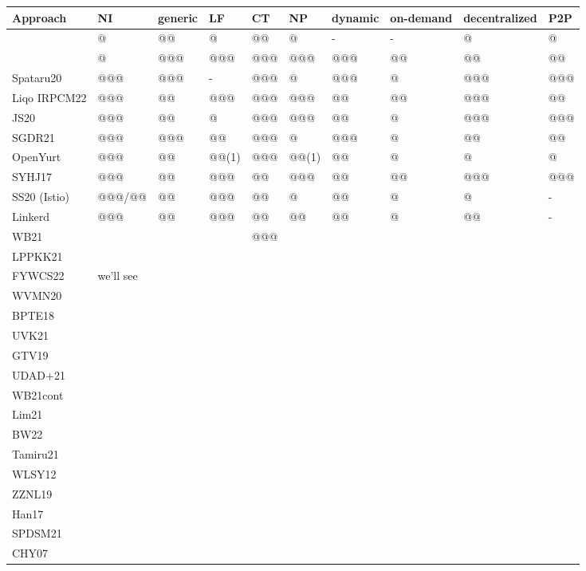 \documentclass[11pt]{article}
\author{moi}
\date{\today}
\title{}
\begin{document}
\tableofcontents

\begin{center}
\begin{tabular}{llllllllll}
\hline
Approach & NI & generic & LF & CT & NP & dynamic & on-demand & decentralized & P2P\\
\hline
\cite{WFGI+19} & @ & @@ & @ & @@ & @ & - & - & @ & @\\
\cite{TSS21} & @ & @@@ & @@@ & @@@ & @@@ & @@@ & @@ & @@ & @@\\
\hline
Spataru20 & @@@ & @@@ & - & @@@ & @ & @@@ & @ & @@@ & @@@\\
Liqo IRPCM22 & @@@ & @@ & @@@ & @@@ & @@@ & @@ & @@ & @@@ & @@\\
JS20 & @@@ & @@ & @ & @@@ & @@@ & @@ & @ & @@@ & @@@\\
\hline
SGDR21 & @@@ & @@@ & @@ & @@@ & @ & @@@ & @ & @@ & @@\\
OpenYurt & @@@ & @@ & @@(1) & @@@ & @@(1) & @@ & @ & @ & @\\
SYHJ17 & @@@ & @@ & @@@ & @@ & @@@ & @@ & @@ & @@@ & @@@\\
\hline
SS20 (Istio) & @@@/@@ & @@ & @@@ & @@ & @ & @@ & @ & @ & -\\
Linkerd & @@@ & @@ & @@@ & @@ & @@ & @@ & @ & @@ & -\\
\hline
WB21 &  &  &  & @@@ &  &  &  &  & \\
LPPKK21 &  &  &  &  &  &  &  &  & \\
\hline
FYWCS22 & we'll see &  &  &  &  &  &  &  & \\
WVMN20 &  &  &  &  &  &  &  &  & \\
BPTE18 &  &  &  &  &  &  &  &  & \\
\hline
UVK21 &  &  &  &  &  &  &  &  & \\
GTV19 &  &  &  &  &  &  &  &  & \\
UDAD+21 &  &  &  &  &  &  &  &  & \\
WB21cont &  &  &  &  &  &  &  &  & \\
Lim21 &  &  &  &  &  &  &  &  & \\
BW22 &  &  &  &  &  &  &  &  & \\
Tamiru21 &  &  &  &  &  &  &  &  & \\
WLSY12 &  &  &  &  &  &  &  &  & \\
ZZNL19 &  &  &  &  &  &  &  &  & \\
Han17 &  &  &  &  &  &  &  &  & \\
SPDSM21 &  &  &  &  &  &  &  &  & \\
CHY07 &  &  &  &  &  &  &  &  & \\

\end{tabular}
\end{center}
\end{document}
